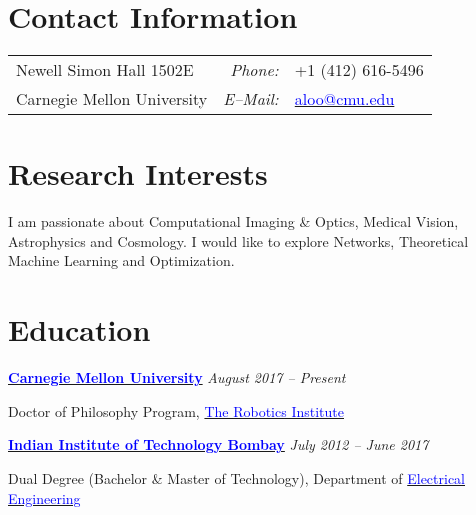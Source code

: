 \documentclass[margin,line]{res}
\newenvironment{list1}{
  \begin{list}{\ding{113}}{%
      \setlength{\itemsep}{0in}
      \setlength{\parsep}{0in} \setlength{\parskip}{0in}
      \setlength{\topsep}{0in} \setlength{\partopsep}{0in} 
      \setlength{\leftmargin}{0.17in}}}{\end{list}}
\begin{document}

\begin{resume}

\section{\sc Contact Information}
\vspace{.05in}
\begin{tabular}{@{}p{2.9in}p{.5in}p{3in}}
Newell Simon Hall 1502E & \multicolumn{1}{r}{\it Phone:}  & +1 (412) 616-5496 \\            
Carnegie Mellon University &\multicolumn{1}{r}{\it E--Mail:}& \href{mailto:aloo@cmu.edu}{\textcolor{blue}{aloo@cmu.edu}} \\ 
\end{tabular}


\section{\sc Research Interests}
I am passionate about Computational Imaging \& Optics, Medical Vision, Astrophysics and Cosmology. I would like to explore Networks, Theoretical Machine Learning and Optimization.


\section{\sc Education}
{\bf \href{http://www.cmu.edu/}{\textcolor{blue}{Carnegie Mellon University}}} \hfill {\it August 2017 -- Present} \\
\vspace*{-.1in}
\begin{list1}
\item[] Doctor of Philosophy Program, \href{http://www.ri.cmu.edu/}{\textcolor{blue}{The Robotics Institute}}
\end{list1}
\vspace*{-.1in}
{\bf \href{http://www.iitb.ac.in/}{\textcolor{blue}{Indian Institute of Technology Bombay}}} \hfill {\it July 2012 -- June 2017} \\
\vspace*{-.1in}
\begin{list1}
\item[] Dual Degree (Bachelor \& Master of Technology), Department of \href{http://www.ee.iitb.ac.in/}{\textcolor{blue}{Electrical Engineering}}
\end{list1}


\end{resume}
\end{document}
